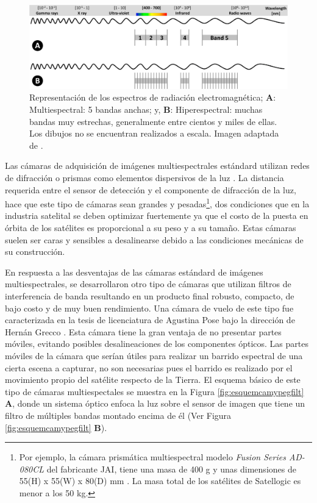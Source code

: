 \begin{figure}[H]
	\centering
	\includegraphics[scale=0.2]{Figs/introduccion/multivshyper.png}
	\caption{ Representación de los espectros de radiación electromagnética; \textbf{A}: Multiespectral: 5 
		bandas anchas; y, \textbf{B}: Hiperespectral: muchas bandas muy estrechas, 
		generalmente entre cientos y miles de ellas. Los dibujos no se 
		encuentran 
		realizados a escala. Imagen adaptada de \cite{Adao2017}.}
	\label{fig:spectrus}
\end{figure}


Las cámaras de adquisición de imágenes multiespectrales estándard utilizan 
redes de difracción o prismas como elementos dispersivos de la luz \cite{5459162}. La 
distancia requerida entre el sensor de detección y el componente de difracción 
de la luz, hace que este tipo de cámaras sean grandes y pesadas\footnote{Por ejemplo, la cámara prismática multiespectral modelo \textit{Fusion Series AD-080CL} del fabricante JAI, tiene una masa de 400 g y unas dimensiones de 55(H) x 55(W) x 80(D) mm \cite{jaii}. La masa total de los satélites de Satellogic es menor a los 50 kg.}, dos condiciones que en la industria satelital se deben optimizar 
fuertemente ya que el costo de la puesta en órbita de los satélites es 
proporcional a su peso y a su tamaño. Estas cámaras suelen ser caras y 
sensibles a desalinearse debido a las condiciones mecánicas de su construcción. 

En respuesta a las desventajas de las cámaras estándard de imágenes multiespectrales, se desarrollaron otro tipo de cámaras que utilizan filtros de interferencia de banda resultando en un producto final robusto, compacto, 
de bajo costo y de muy buen rendimiento. Una cámara de vuelo de este tipo fue caracterizada en la tesis de licenciatura de Agustina Pose bajo la dirección de Hernán Grecco \cite{Pose2017}. 
Esta cámara tiene la gran ventaja de no presentar partes móviles, 
evitando posibles desalineaciones de los componentes ópticos. Las partes 
móviles de la cámara que serían útiles para realizar un barrido espectral de 
una cierta escena a capturar, no son necesarias pues el barrido es realizado 
por el movimiento propio del satélite respecto de la Tierra. El esquema básico 
de este tipo de 
cámaras multiespectales se muestra 
en la Figura \ref{fig:esquemcamypegfilt} \textbf{A}, donde un sistema óptico enfoca la luz sobre el sensor de imagen que tiene un filtro de múltiples bandas montado encima de él (Ver Figura \ref{fig:esquemcamypegfilt} \textbf{B}).


